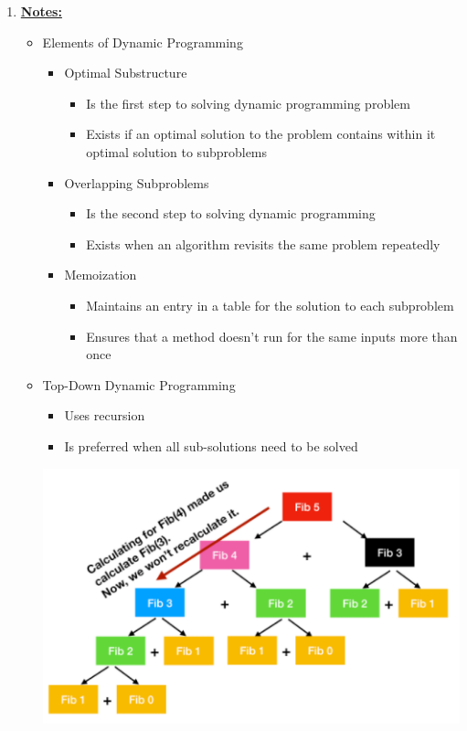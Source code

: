 \documentclass[12pt]{article}
\begin{document}
\begin{enumerate}[1.]
    \item

    \bigskip

    \underline{\textbf{Notes:}}

    \bigskip

    \begin{itemize}
        \item Elements of Dynamic Programming
        \begin{itemize}
            \item Optimal Substructure
            \begin{itemize}
                \item Is the first step to solving dynamic programming problem
                \item Exists if an optimal solution to the problem contains within it optimal
                solution to subproblems
            \end{itemize}
            \item Overlapping Subproblems

            \begin{itemize}
                \item Is the second step to solving dynamic programming
                \item Exists when an algorithm revisits the same problem repeatedly
            \end{itemize}
            \item Memoization
            \begin{itemize}
                \item Maintains an entry in a table for the solution to each subproblem
                \item Ensures that a method doesn't run for the same inputs more than once
            \end{itemize}
        \end{itemize}

        \item Top-Down Dynamic Programming
        \begin{itemize}
            \item Uses recursion
            \item Is preferred when all sub-solutions need to be solved
        \end{itemize}


        \begin{center}
        \includegraphics[width=0.7\linewidth]{images/worksheet_3_solution_8.png}
        \end{center}


\end{itemize}
\end{enumerate}
\end{document}

